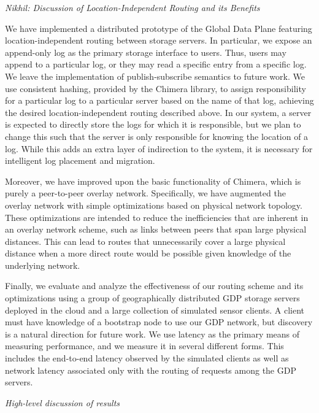\textit{Nikhil: Discussion of Location-Independent Routing and its Benefits}

We have implemented a distributed prototype of the Global Data Plane featuring location-independent routing between storage servers. In particular, we expose an append-only log as the primary storage interface to users. Thus, users may append to a particular log, or they may read a specific entry from a specific log. We leave the implementation of publish-subscribe semantics to future work. We use consistent hashing, provided by the Chimera\cite{chimera} library, to assign responsibility for a particular log to a particular server based on the name of that log, achieving the desired location-independent routing described above. In our system, a server is expected to directly store the logs for which it is responsible, but we plan to change this such that the server is only responsible for knowing the location of a log. While this adds an extra layer of indirection to the system, it is necessary for intelligent log placement and migration.

Moreover, we have improved upon the basic functionality of Chimera, which is purely a peer-to-peer overlay network. Specifically, we have augmented the overlay network with simple optimizations based on physical network topology. These optimizations are intended to reduce the inefficiencies that are inherent in an overlay network scheme, such as links between peers that span  large physical distances. This can lead to routes that unnecessarily cover a large physical distance when a more direct route would be possible given knowledge of the underlying network.

Finally, we evaluate and analyze the effectiveness of our routing scheme and its optimizations using a group of geographically distributed GDP storage servers deployed in the cloud and a large collection of simulated sensor clients. A client must have knowledge of a bootstrap node to use our GDP network, but discovery is a natural direction for future work. We use latency as the primary means of measuring performance, and we measure it in several different forms. This includes the end-to-end latency observed by the simulated clients as well as network latency associated only with the routing of requests among the GDP servers.

\textit{High-level discussion of results}
